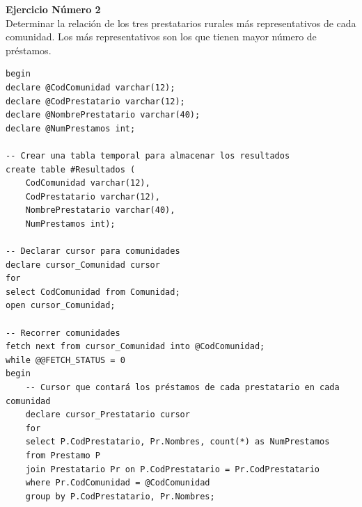 \documentclass[a4paper]{article}
\begin{document}
\restoregeometry
\newpage

\Large{\textbf{Ejercicio Número 2}}\\
Determinar la relación de los tres prestatarios rurales más representativos de cada comunidad. Los más representativos son los que tienen mayor número de préstamos.
\begin{center}
\begin{mycodeboxl}
\begin{lstlisting}
begin
declare @CodComunidad varchar(12);
declare @CodPrestatario varchar(12);
declare @NombrePrestatario varchar(40);
declare @NumPrestamos int;

-- Crear una tabla temporal para almacenar los resultados
create table #Resultados (
    CodComunidad varchar(12),
    CodPrestatario varchar(12),
    NombrePrestatario varchar(40),
    NumPrestamos int);

-- Declarar cursor para comunidades
declare cursor_Comunidad cursor
for
select CodComunidad from Comunidad;
open cursor_Comunidad;

-- Recorrer comunidades
fetch next from cursor_Comunidad into @CodComunidad;
while @@FETCH_STATUS = 0
begin
    -- Cursor que contará los préstamos de cada prestatario en cada comunidad
    declare cursor_Prestatario cursor
    for
    select P.CodPrestatario, Pr.Nombres, count(*) as NumPrestamos
    from Prestamo P
    join Prestatario Pr on P.CodPrestatario = Pr.CodPrestatario
    where Pr.CodComunidad = @CodComunidad
    group by P.CodPrestatario, Pr.Nombres;
\end{lstlisting}
\end{mycodeboxl}
\end{center}
\newpage
\end{document}
